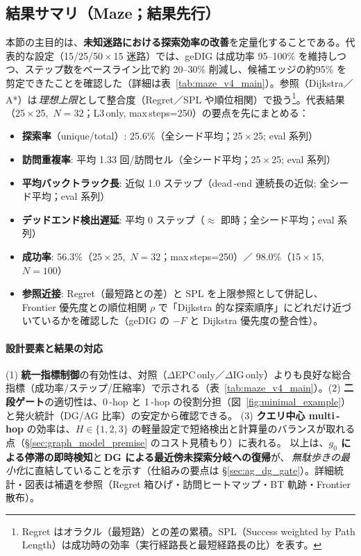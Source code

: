 \documentclass[ja=standard,xelatex]{bxjsarticle}
\begin{document}
\subsection*{結果サマリ（Maze；結果先行）}
\label{sec:maze_result_summary}
本節の主目的は、\textbf{未知迷路における探索効率の改善}を定量化することである。代表的な設定（15/25/50\,\mbox{$\times$}\,15 迷路）では、geDIG は成功率 95--100\% を維持しつつ、ステップ数をベースライン比で約 20--30\% 削減し、候補エッジの約95\% を剪定できたことを確認した（詳細は表~\ref{tab:maze_v4_main}）。参照（Dijkstra／A*）は\,\emph{理想上限}として整合度（Regret／SPL や順位相関）で扱う\footnote{Regret はオラクル（最短路）との差の累積。SPL（Success weighted by Path Length）は成功時の効率（実行経路長と最短経路長の比）を表す。}。代表結果（25\,\mbox{$\times$}\,25, \,$N{=}32$；L3\,only, max\,steps=250）の要点を先にまとめる：
\begin{itemize}[leftmargin=1.4em]
  \item \textbf{探索率}（unique/total）: 25.6\%（全シード平均；25\,\mbox{$\times$}\,25; eval 系列）
  \item \textbf{訪問重複率}: 平均 1.33 回/訪問セル（全シード平均；25\,\mbox{$\times$}\,25; eval 系列）
  \item \textbf{平均バックトラック長}: 近似 1.0 ステップ（dead\,\mbox{-}end 連続長の近似; 全シード平均；eval 系列）
  \item \textbf{デッドエンド検出遅延}: 平均 0 ステップ（$\approx$ 即時；全シード平均；eval 系列）
  \item \textbf{成功率}: 56.3\%（25\,\mbox{$\times$}\,25, \,$N{=}32$；max\,steps=250）／ 98.0\%（15\,\mbox{$\times$}\,15, \,$N{=}100$）
  \item \textbf{参照近接}: Regret（最短路との差）と SPL を上限参照として併記し、Frontier 優先度との順位相関 $\rho$ で「Dijkstra 的な探索順序」にどれだけ近づいているかを確認した（geDIG の $-F$ と Dijkstra 優先度の整合性）。
\end{itemize}

\paragraph{設計要素と結果の対応}\; (1) \textbf{統一指標制御}の有効性は、対照（$\Delta$EPC\,only／$\Delta$IG\,only）よりも良好な総合指標（成功率/ステップ/圧縮率）で示される（表~\ref{tab:maze_v4_main}）。(2) \textbf{二段ゲート}の適切性は、0\,\mbox{-}hop と 1\,\mbox{-}hop の役割分担（図~\ref{fig:minimal_example}）と発火統計（DG/AG 比率）の安定から確認できる。 (3) \textbf{クエリ中心 multi\,\mbox{-}hop} の効率は、$H\in\{1,2,3\}$ の軽量設定で短絡検出と計算量のバランスが取れる点（§\ref{sec:graph_model_premise} のコスト見積もり）に表れる。
\noindent 以上は、\textbf{$g_0$ による停滞の即時検知}と\,\textbf{DG による最近傍未探索分岐への復帰}が、\,\emph{無駄歩きの最小化}に直結していることを示す（仕組みの要点は \S\ref{sec:ag_dg_gate}）。詳細統計・図表は補遺を参照（Regret 箱ひげ・訪問ヒートマップ・BT 軌跡・Frontier 散布）。
\end{document}
